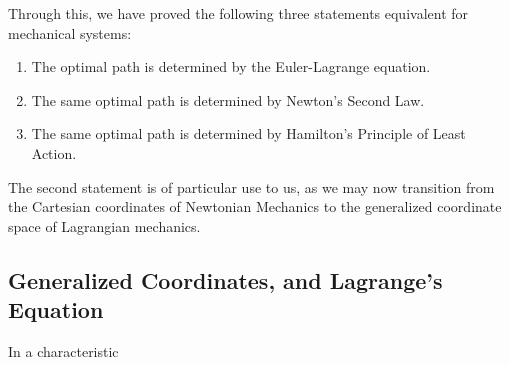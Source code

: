 \documentclass[psamsfonts]{amsart}
\theoremstyle{definition}
\theoremstyle{remark}
\numberwithin{equation}{section}
\begin{document}
Through this, we have proved the following three statements equivalent for mechanical systems:
\begin{enumerate}
\item The optimal path is determined by the Euler-Lagrange equation.
\item The same optimal path is determined by Newton's Second Law.
\item The same optimal path is determined by Hamilton's Principle of Least Action.
\end{enumerate}
The second statement is of particular use to us, as we may now transition from the Cartesian coordinates of Newtonian Mechanics to the generalized coordinate space of Lagrangian mechanics.

\subsection{Generalized Coordinates, and Lagrange's Equation}
In a characteristic 
\end{document}
